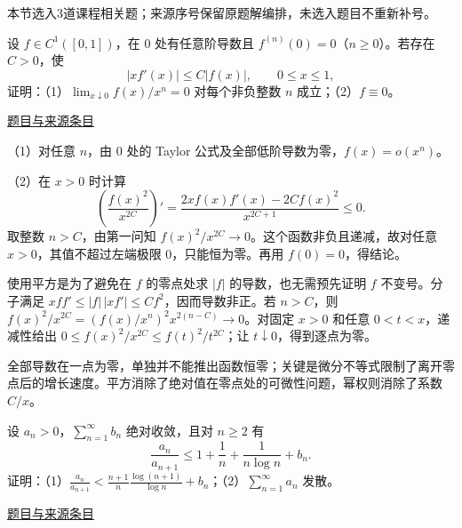 \documentclass[12pt,fontset=fandol]{ctexart}
\begin{document}
本节选入3道课程相关题；来源序号保留原题解编排，未选入题目不重新补号。

\begin{example}[来源序号4]\label{ex:pre10-math:4}\label{pr:pre10-math:4}

设 $f\in C^1([0,1])$，在 $0$ 处有任意阶导数且 $f^{(n)}(0)=0$（$n\ge0$）。若存在 $C>0$，使
\[
|xf'(x)|\le C|f(x)|,\qquad 0\le x\le1,
\]
证明：（1）$\lim_{x\downarrow0}f(x)/x^n=0$ 对每个非负整数 $n$ 成立；（2）$f\equiv0$。

\par\href{https://github.com/lzxcr/cmc-mathematics/blob/64916fa1fdbc3e444a652eca204d5669058ee321/src/problems/preliminary/10/04.md}{题目与来源条目}

\end{example}

\begin{solve}\label{ans:pre10-math:4}

（1）对任意 $n$，由 $0$ 处的 Taylor 公式及全部低阶导数为零，$f(x)=o(x^n)$。

（2）在 $x>0$ 时计算
\[
\left(\frac{f(x)^2}{x^{2C}}\right)'
=\frac{2xf(x)f'(x)-2Cf(x)^2}{x^{2C+1}}\le0.
\]
取整数 $n>C$，由第一问知 $f(x)^2/x^{2C}\to0$。这个函数非负且递减，故对任意 $x>0$，其值不超过左端极限 $0$，只能恒为零。再用 $f(0)=0$，得结论。

使用平方是为了避免在 $f$ 的零点处求 $|f|$ 的导数，也无需预先证明 $f$ 不变号。分子满足 $xf f'\le |f|\,|xf'|\le Cf^2$，因而导数非正。若 $n>C$，则 $f(x)^2/x^{2C}=(f(x)/x^n)^2x^{2(n-C)}\to0$。对固定 $x>0$ 和任意 $0<t<x$，递减性给出 $0\le f(x)^2/x^{2C}\le f(t)^2/t^{2C}$；让 $t\downarrow0$，得到逐点为零。

\end{solve}

\begin{remark}[方法与条件]全部导数在一点为零，单独并不能推出函数恒零；关键是微分不等式限制了离开零点后的增长速度。平方消除了绝对值在零点处的可微性问题，幂权则消除了系数 $C/x$。\end{remark}

\begin{example}[来源序号5]\label{ex:pre10-math:5}\label{pr:pre10-math:5}

设 $a_n>0$，$\sum_{n=1}^\infty b_n$ 绝对收敛，且对 $n\ge2$ 有
\[
\frac{a_n}{a_{n+1}}\le1+\frac1n+\frac1{n\log n}+b_n.
\]
证明：（1）$\displaystyle\frac{a_n}{a_{n+1}}<\frac{n+1}{n}\frac{\log(n+1)}{\log n}+b_n$；（2）$\sum_{n=1}^\infty a_n$ 发散。

\par\href{https://github.com/lzxcr/cmc-mathematics/blob/64916fa1fdbc3e444a652eca204d5669058ee321/src/problems/preliminary/10/05.md}{题目与来源条目}

\end{example}
\end{document}
